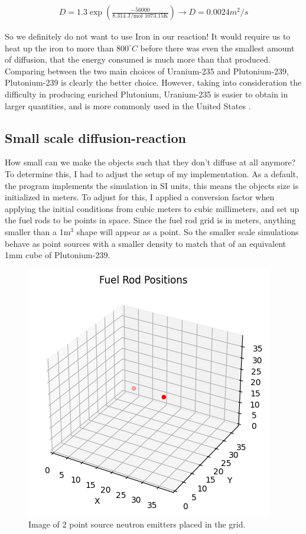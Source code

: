 \documentclass[letterpaper, 12pt]{article}
\begin{document}
         \begin{align}
            D = 1.3\exp \left(\frac{-56000}{ 8.314 \text{ J/mol } 1073.15 \text{K}}\right) \longrightarrow D = 0.0024 m^2/s
         \end{align}

         So we definitely do not want to use Iron in our reaction! It would require us to heat up the iron to more than $800^\circ C$ before there was even the smallest amount of diffusion, that the energy consumed is much more than that produced. \\

         Comparing between the two main choices of Uranium-235 and Plutonium-239, Plutonium-239 is clearly the better choice. However, taking into consideration the difficulty in producing enriched Plutonium, Uranium-235 is easier to obtain in larger quantities, and is more commonly used in the United States \cite{What-is-Plutonium?}.
      \subsection{Small scale diffusion-reaction}
         How small can we make the objects such that they don't diffuse at all anymore? To determine this, I had to adjust the setup of my implementation. As a default, the program implements the simulation in SI units, this means the objects size is initialized in meters. To adjust for this, I applied a conversion factor when applying the initial conditions from cubic meters to cubic millimeters, and set up the fuel rods to be points in space. Since the fuel rod grid is in meters, anything smaller than a 1m$^3$ shape will appear as a point. So the smaller scale simulations behave as point sources with a smaller density to match that of an equivalent 1mm cube of Plutonium-239. 

         \begin{figure}[h!]
            \centering
            \includegraphics[width=0.4\linewidth]{Graphs/Small-Simulation.png}
            \caption{Image of 2 point source neutron emitters placed in the grid.}
            \label{img:Small Objects in Grid}
         \end{figure}
\end{document}
